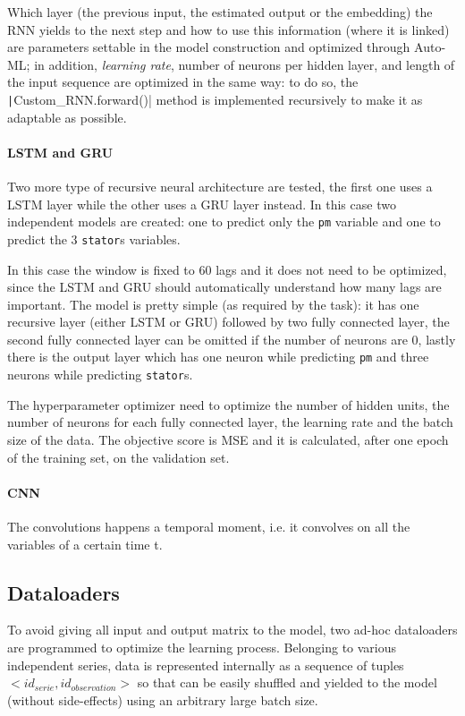 Which layer (the previous input, the estimated output or the embedding) the RNN yields to the next step and how to use this information (where it is linked) are parameters settable in the model construction and optimized through Auto-ML; in addition, \textit{learning rate}, number of neurons per hidden layer, and length of the input sequence are optimized in the same way: to do so, the \texttt|Custom_RNN.forward()| method is implemented recursively to make it as adaptable as possible.

\paragraph{LSTM and GRU}
Two more type of recursive neural architecture are tested, the first one uses a LSTM layer while the other uses a GRU layer instead.
In this case two independent models are created: one to predict only the \verb|pm| variable and one to predict the 3 \verb|stator|s variables.

In this case the window is fixed to 60 lags and it does not need to be optimized, since the LSTM and GRU should automatically understand how many lags are important.
The model is pretty simple (as required by the task): it has one recursive layer (either LSTM or GRU) followed by two fully connected layer, the second fully connected layer can be omitted if the number of neurons are 0, lastly there is the output layer which has one neuron while predicting \verb|pm| and three neurons while predicting \verb|stator|s.

The hyperparameter optimizer need to optimize the number of hidden units, the number of neurons for each fully connected layer, the learning rate and the batch size of the data.
The objective score is MSE and it is calculated, after one epoch of the training set, on the validation set.

\paragraph{CNN}
The convolutions happens a temporal moment, i.e. it convolves on all the variables of a certain time t.

\subsection{Dataloaders}
To avoid giving all input and output matrix to the model, two ad-hoc dataloaders are programmed to optimize the learning process.
Belonging to various independent series, data is represented internally as a sequence of tuples $<id_{serie}, id_{observation}>$ so that can be easily shuffled and yielded to the model (without side-effects) using an arbitrary large batch size.

